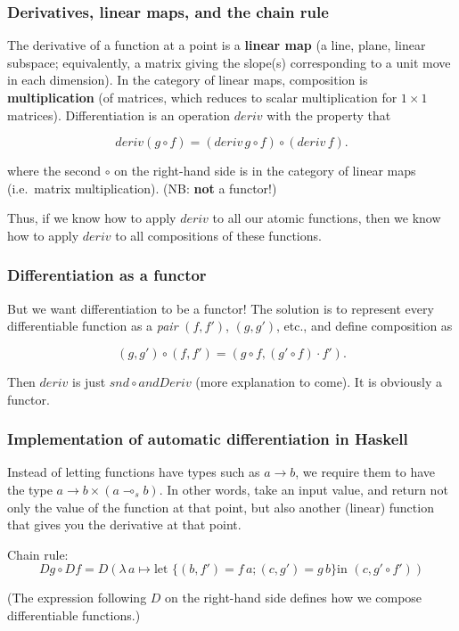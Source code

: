 \documentclass[10pt]{beamer}
\newcommand{\lamf}[2]{\ensuremath{\lambda\, #1 \mapsto #2}}
\theoremstyle{definition}
\theoremstyle{remark}
\numberwithin{equation}{section}
\begin{document}
\begin{frame}[fragile]
  \frametitle{Derivatives, linear maps, and the chain rule}
  
  The derivative of a function at a point is a \textbf{linear map} (a line,
  plane, linear subspace; equivalently, a matrix giving the slope(s)
  corresponding to a unit move in each dimension). In the category of linear
  maps, composition is \textbf{multiplication} (of matrices, which reduces to
  scalar multiplication for $1 \times 1$ matrices). Differentiation is an operation
  $deriv$ with the property that

  \[
    deriv(g \circ f) = (deriv\, g \circ f) \circ (deriv\, f).
  \]

  where the second $\circ$ on the right-hand side is in the category of linear maps
  (i.e.\ matrix multiplication). {\small (NB: \textbf{not} a functor!)}

  Thus, if we know how to apply $deriv$ to all our atomic functions, then we
  know how to apply $deriv$ to all compositions of these functions.
  
\end{frame}

\begin{frame}[fragile]
  \frametitle{Differentiation as a functor}

  But we want differentiation to be a functor! The solution is to represent
  every differentiable function as a \emph{pair} $(f,f')$, $(g,g')$, etc., and
  define composition as

  \[
    (g,g') \circ (f,f') = (g \circ f, (g' \circ f) \cdot f').
  \]

  Then $deriv$ is just $snd \circ andDeriv$ (more explanation to come). It is
  obviously a functor.
  
\end{frame}

\begin{frame}[fragile]
  \frametitle{Implementation of automatic differentiation in Haskell}

  Instead of letting functions have types such as $a \rightarrow b$, we require them to
  have the type $a \rightarrow b \times (a \multimap_s b)$. In other words, take an input
  value, and return not only the value of the function at that point, but also
  another (linear) function that gives you the derivative at that point.

  Chain rule:
  \[
    Dg \circ Df = D (\lamf{a}{\text{let } \{(b, f') = f\,a; (c,g') = g\,b\} \text{
        in }
    (c, g' \circ f')})
\]

(The expression following $D$ on the right-hand side defines how we
compose differentiable functions.)
\end{frame}
\end{document}

